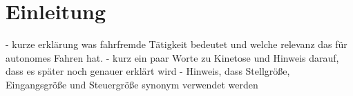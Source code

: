 \chapter{Einleitung}\label{cha:Einleitung}

- kurze erklärung was fahrfremde Tätigkeit bedeutet und welche relevanz das für autonomes Fahren hat. 
- kurz ein paar Worte zu Kinetose und Hinweis darauf, dass es später noch genauer erklärt wird
- Hinweis, dass Stellgröße, Eingangsgröße und Steuergröße synonym verwendet werden
